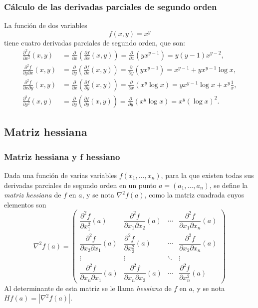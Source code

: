 \begin{frame}
	\frametitle{Cálculo de las derivadas parciales de segundo orden}
	La función de dos variables
	\[f(x,y)=x^y\]
	tiene cuatro derivadas parciales de segundo orden, que son:
	\begin{align*}
		\frac{\partial^2 f}{\partial x^2}(x,y)          & = 
		\frac{\partial}{\partial x}\left(\frac{\partial f}{\partial x}(x,y)\right) =
		\frac{\partial}{\partial x}\left(yx^{y-1}\right) =
		y(y-1)x^{y-2},\\
		\frac{\partial^2 f}{\partial y \partial x}(x,y) & = 
		\frac{\partial}{\partial y}\left(\frac{\partial f}{\partial x}(x,y)\right) =
		\frac{\partial}{\partial y}\left(yx^{y-1}\right) =
		x^{y-1}+yx^{y-1}\log x,\\
		\frac{\partial^2 f}{\partial x \partial y}(x,y) & = 
		\frac{\partial}{\partial x}\left(\frac{\partial f}{\partial y}(x,y)\right) =
		\frac{\partial}{\partial x}\left(x^y\log x \right) =
		yx^{y-1}\log x+x^y\frac{1}{x},\\
		\frac{\partial^2 f}{\partial y^2}(x,y)          & = 
		\frac{\partial}{\partial y}\left(\frac{\partial f}{\partial y}(x,y)\right) =
		\frac{\partial}{\partial y}\left(x^y\log x \right) =
		x^y(\log x)^2.
	\end{align*}
\end{frame}


\subsection{Matriz hessiana}
\begin{frame}
	\frametitle{Matriz hessiana y f hessiano}
	\begin{definicion}
		Dada una función de varias variables $f(x_1,\ldots,x_n)$, para la que existen todas sus derivadas parciales de segundo
		orden en un punto $a=(a_1,\ldots,a_n)$, se define la \emph{matriz hessiana} de $f$ en $a$, y se nota $\nabla^2f(a)$, como la
		matriz cuadrada cuyos elementos son
		\[
			\nabla^2f(a)=\left(
			\begin{array}{cccc}
				\dfrac{\partial^2 f}{\partial x_1^2}(a) & 
				\dfrac{\partial^2 f}{\partial x_1 \partial x_2}(a) &
				\cdots &
				\dfrac{\partial^2 f}{\partial x_1 \partial x_n}(a)\\
				\dfrac{\partial^2 f}{\partial x_2 \partial x_1}(a) &
				\dfrac{\partial^2 f}{\partial x_2^2}(a) & 
				\cdots &
				\dfrac{\partial^2 f}{\partial x_2 \partial x_n}(a)\\
				\vdots & \vdots & \ddots & \vdots \\
				\dfrac{\partial^2 f}{\partial x_n \partial x_1}(a) &
				\dfrac{\partial^2 f}{\partial x_n \partial x_2}(a) &
				\cdots &
				\dfrac{\partial^2 f}{\partial x_n^2}(a)
			\end{array}
			\right)
		\]
		Al determinante de esta matriz se le llama \emph{hessiano} de $f$ en $a$, y se nota $Hf(a)=|\nabla^2f(a)|$.
	\end{definicion}
\end{frame}


